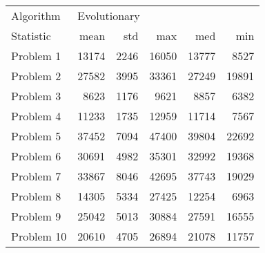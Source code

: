 \begin{tabular}{lrrrrr}
\toprule
Algorithm & \multicolumn{5}{l}{Evolutionary} \\
Statistic &         mean &   std &    max &    med &    min \\
\midrule
Problem 1  &        13174 &  2246 &  16050 &  13777 &   8527 \\
Problem 2  &        27582 &  3995 &  33361 &  27249 &  19891 \\
Problem 3  &         8623 &  1176 &   9621 &   8857 &   6382 \\
Problem 4  &        11233 &  1735 &  12959 &  11714 &   7567 \\
Problem 5  &        37452 &  7094 &  47400 &  39804 &  22692 \\
Problem 6  &        30691 &  4982 &  35301 &  32992 &  19368 \\
Problem 7  &        33867 &  8046 &  42695 &  37743 &  19029 \\
Problem 8  &        14305 &  5334 &  27425 &  12254 &   6963 \\
Problem 9  &        25042 &  5013 &  30884 &  27591 &  16555 \\
Problem 10 &        20610 &  4705 &  26894 &  21078 &  11757 \\
\bottomrule
\end{tabular}
